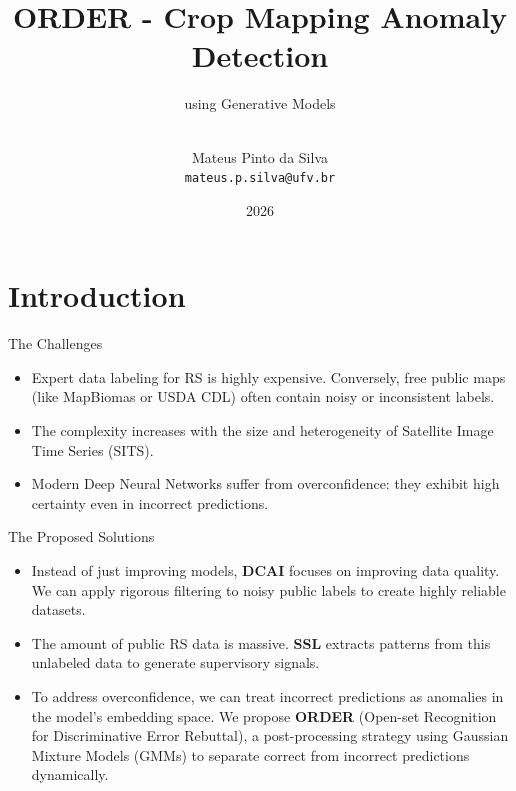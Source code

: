 \documentclass{beamer}
\title{ORDER - Crop Mapping Anomaly Detection}
\subtitle{using Generative Models}
\author[Mateus Pinto da Silva]{\texorpdfstring{\logo \\ Mateus Pinto da Silva\\ \texttt{mateus.p.silva@ufv.br}}{Mateus Pinto da Silva}}
\institute[DPI - UFV]{Programa de Pós-Graduação em Ciência da Computação\\Universidade Federal de Viçosa}
\date{2026}
\newcommand{\currprop}{0.6\textheight}
\begin{document}
\invisivel


\frame{\titlepage}

\section{Introduction}
\label{sec:01:intro}

\renewcommand{\currprop}{0.8\textwidth}

\begin{frame}{The Challenges}
    \begin{itemize}
        \item Expert data labeling for RS is highly expensive. Conversely, free public maps (like MapBiomas or USDA CDL) often contain noisy or inconsistent labels.
        \pause
        \item The complexity increases with the size and heterogeneity of Satellite Image Time Series (SITS).
        \pause
        \item Modern Deep Neural Networks suffer from overconfidence: they exhibit high certainty even in incorrect predictions.
    \end{itemize}
\end{frame}

\begin{frame}{The Proposed Solutions}
    \begin{itemize}
        \item Instead of just improving models, \textbf{DCAI} focuses on improving data quality. We can apply rigorous filtering to noisy public labels to create highly reliable datasets.
        \pause
        \item The amount of public RS data is massive. \textbf{SSL} extracts patterns from this unlabeled data to generate supervisory signals.
        \pause
        \item To address overconfidence, we can treat incorrect predictions as anomalies in the model's embedding space. We propose \textbf{ORDER} (Open-set Recognition for Discriminative Error Rebuttal), a post-processing strategy using Gaussian Mixture Models (GMMs) to separate correct from incorrect predictions dynamically.
    \end{itemize}
\end{frame}
\end{document}
